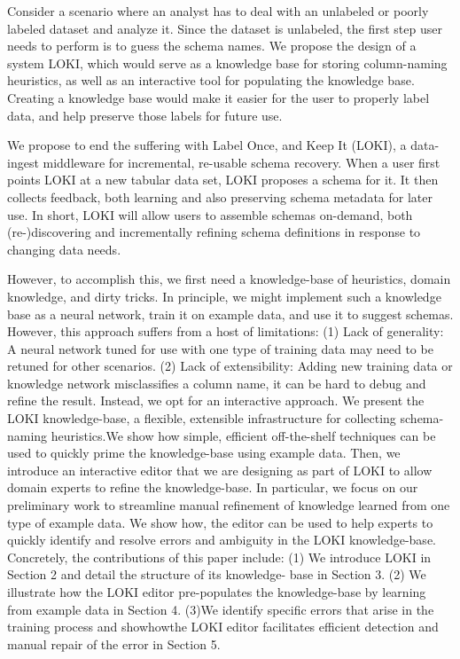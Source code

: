 \documentclass{vldb}
\begin{document}
Consider a scenario where an analyst has to deal with an unlabeled or poorly labeled dataset and analyze it. Since the dataset is unlabeled, the first step user needs to perform is to guess the schema names. We propose the design of a system LOKI, which would serve as a knowledge base for storing column-naming heuristics, as well as an interactive tool for populating the knowledge base. Creating a knowledge base would make it easier for the user to properly label data, and help preserve those labels for future use. 

We propose to end the suffering with Label Once, and Keep It (LOKI),
a data-ingest middleware for incremental, re-usable schema recovery.
When a user first points LOKI at a new tabular data set, LOKI proposes a schema for it. It then collects feedback, both learning and also preserving schema metadata for later use. In short, LOKI will allow users to assemble schemas on-demand, both (re-)discovering and incrementally refining schema definitions in response to changing data needs. 

However, to accomplish this, we first need a knowledge-base of heuristics, domain knowledge, and dirty tricks. In principle, we might implement such a knowledge base as a neural network, train it on example data, and use it to suggest schemas. However, this approach suffers from a host of limitations:
(1) Lack of generality: A neural network tuned for use with one
type of training data may need to be retuned for other scenarios.
(2) Lack of extensibility: Adding new training data or knowledge network misclassifies a column name, it can be hard to debug and
refine the result. Instead, we opt for an interactive approach. We
present the LOKI knowledge-base, a flexible, extensible infrastructure
for collecting schema-naming heuristics.We show how simple,
efficient off-the-shelf techniques can be used to quickly prime the
knowledge-base using example data. Then, we introduce an interactive
editor that we are designing as part of LOKI to allow domain
experts to refine the knowledge-base. In particular, we focus on our
preliminary work to streamline manual refinement of knowledge
learned from one type of example data. We show how, the editor
can be used to help experts to quickly identify and resolve errors
and ambiguity in the LOKI knowledge-base.
Concretely, the contributions of this paper include: (1) We introduce
LOKI in Section 2 and detail the structure of its knowledge-
base in Section 3. (2) We illustrate how the LOKI editor
pre-populates the knowledge-base by learning from example data
in Section 4. (3)We identify specific errors that arise in the training
process and showhowthe LOKI editor facilitates efficient detection
and manual repair of the error in Section 5.
\end{document}
